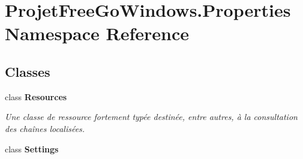 \hypertarget{namespace_projet_free_go_windows_1_1_properties}{}\section{Projet\+Free\+Go\+Windows.\+Properties Namespace Reference}
\label{namespace_projet_free_go_windows_1_1_properties}
\subsection*{Classes}
\begin{DoxyCompactItemize}
\item 
class {\bfseries Resources}
\begin{DoxyCompactList}\small\item\em Une classe de ressource fortement typée destinée, entre autres, à la consultation des chaînes localisées. \end{DoxyCompactList}\item 
class {\bfseries Settings}
\end{DoxyCompactItemize}
